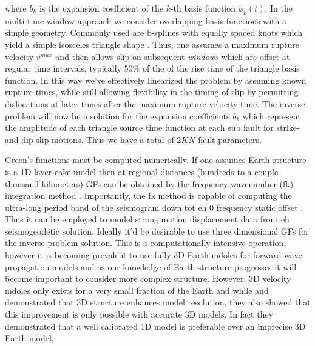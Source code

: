 where $b_k$ is the expansion coefficient of the $k$-th basis function $\phi_k(t)$. In the multi-time window approach we consider overlapping basis functions with a simple geometry. Commonly used are b-splines with equally spaced knots which yield a simple isosceles triangle shape \citet{ide1996,wu2001}. 
Thus, one assumes a maximum rupture velocity $v^{max}$ and then allows slip on subsequent \textit{windows}  which are offset at regular time intervals, typically 50\% of the of the rise time of the triangle basis function. In this way we've effectively linearized the problem by assuming known rupture times, while still allowing flexibility in the timing of slip by permitting dislocations at later times after the maximum rupture velocity time. The inverse problem will now be a solution for the expansion coefficients $b_k$ which represent the amplitude of each triangle source time function at each sub fault for strike- and dip-slip motions. Thus we have a total of $2KN$ fault parameters.

Green's functions must be computed numerically. If one assumes Earth structure is a 1D layer-cake model then at regional distances (hundreds to a couple thousand kilometers) GFs can be obtained by the frequency-wavenumber (fk) integration method \citep{saikia1994}. Importantly, the fk method is capable of computing the ultra-long period band of the seismogram down tot eh 0 frequency static offset \citep{zhu2002}. Thus it can be employed to model strong motion displacement data front eh seismogeodetic solution. Ideally it'd be desirable to use three dimensional GFs for the inverse problem solution. This is a computationally intensive operation, however it is becoming prevalent to use fully 3D Earth mdoles for forward wave propagation models \citep{bielak2010,tromp2010} and as our knowledge of Earth structure progresses it will become important to consider more complex structure. However, 3D velocity mdoles only exists for a very small fraction of the Earth and while \citet{graves2001} and \citet{wald2001} demonstrated that 3D structure enhances model resolution, they also showed that this improvement is only possible with accurate 3D models. In fact they demonstrated that a well calibrated 1D model is preferable over an imprecise 3D Earth model.


